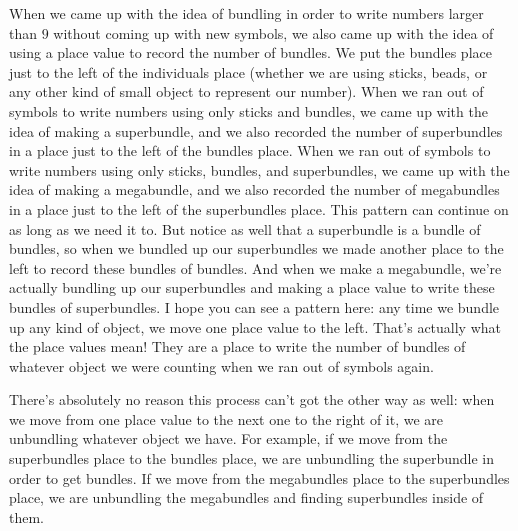 \documentclass{ximera}
\begin{document}
When we came up with the idea of bundling in order to write numbers larger than $9$ without coming up with new symbols, we also came up with the idea of using a place value to record the number of bundles. We put the bundles place just to the left of the individuals place (whether we are using sticks, beads, or any other kind of small object to represent our number). When we ran out of symbols to write numbers using only sticks and bundles, we came up with the idea of making a superbundle, and we also recorded the number of superbundles in a place just to the left of the bundles place. When we ran out of symbols to write numbers using only sticks, bundles, and superbundles, we came up with the idea of making a megabundle, and we also recorded the number of megabundles in a place just to the left of the superbundles place. This pattern can continue on as long as we need it to. But notice as well that a superbundle is a bundle of bundles, so when we bundled up our superbundles we made another place to the left to record these bundles of bundles. And when we make a megabundle, we're actually bundling up our superbundles and making a place value to write these bundles of superbundles. I hope you can see a pattern here: any time we bundle up any kind of object, we move one place value to the left. That's actually what the place values mean! They are a place to write the number of bundles of whatever object we were counting when we ran out of symbols again.

\begin{center}
\end{center}

There's absolutely no reason this process can't got the other way as well: when we move from one place value to the next one to the right of it, we are unbundling whatever object we have. For example, if we move from the superbundles place to the bundles place, we are unbundling the superbundle in order to get bundles. If we move from the megabundles place to the superbundles place, we are unbundling the megabundles and finding superbundles inside of them. 
\end{document}
